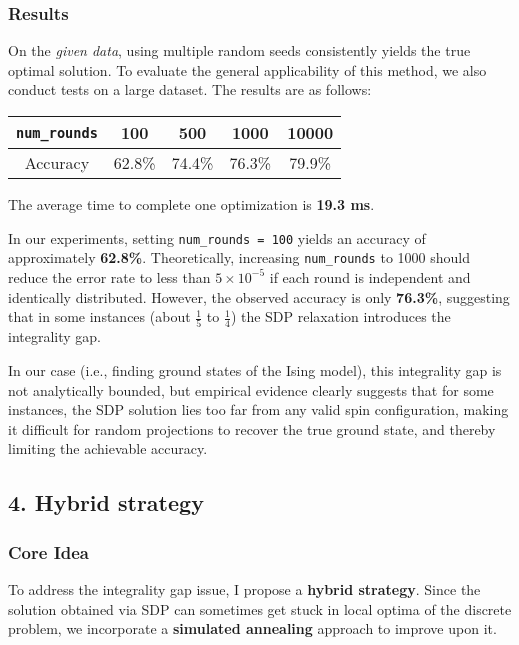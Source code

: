 \documentclass{article}
\begin{document}
\subsubsection*{Results}

On the \textit{given data}, using multiple random seeds consistently yields the true optimal solution. To evaluate the general applicability of this method, we also conduct tests on a large dataset. The results are as follows:

\begin{center}
\begin{tabular}{|c|c|c|c|c|}
\hline
\texttt{num\_rounds} & 100 & 500 & 1000 & 10000 \\
\hline
Accuracy & 62.8\% & 74.4\% & 76.3\% & 79.9\% \\
\hline
\end{tabular}
\end{center}

The average time to complete one optimization is \textbf{19.3 ms}.

In our experiments, setting \texttt{num\_rounds = 100} yields an accuracy of approximately \textbf{62.8\%}. Theoretically, increasing \texttt{num\_rounds} to 1000 should reduce the error rate to less than $5 \times 10^{-5}$ if each round is independent and identically distributed. However, the observed accuracy is only \textbf{76.3\%}, suggesting that in some instances (about $\frac{1}{5}$ to $\frac{1}{4}$) the SDP relaxation introduces the integrality gap.

In our case (i.e., finding ground states of the Ising model), this integrality gap is not analytically bounded, but empirical evidence clearly suggests that for some instances, the SDP solution lies too far from any valid spin configuration, making it difficult for random projections to recover the true ground state, and thereby limiting the achievable accuracy.

\subsection*{4. Hybrid strategy}

\subsubsection*{Core Idea}

To address the integrality gap issue, I propose a \textbf{hybrid strategy}. Since the solution obtained via SDP can sometimes get stuck in local optima of the discrete problem, we incorporate a \textbf{simulated annealing} approach to improve upon it.
\end{document}
